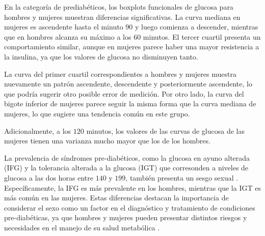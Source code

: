 En la categoría de prediabéticos, los boxplots funcionales de glucosa para hombres y mujeres muestran diferencias significativas. La curva mediana en mujeres es ascendente hasta el minuto $90$ y luego comienza a descender, mientras que en hombres alcanza su máximo a los $60$ minutos. El tercer cuartil presenta un comportamiento similar, aunque en mujeres parece haber una mayor resistencia a la insulina, ya que los valores de glucosa no disminuyen tanto.

La curva del primer cuartil correspondientes a hombres y mujeres muestra nuevamente un patrón ascendente, descendente y posteriormente ascendente, lo que podría sugerir otro posible error de medición. Por otro lado, la curva del bigote inferior de mujeres parece seguir la misma forma que la curva mediana de mujeres, lo que sugiere una tendencia común en este grupo.

Adicionalmente, a los $120$ minutos, los valores de las curvas de glucosa de las mujeres tienen una varianza mucho mayor que los de los hombres. 

La prevalencia de síndromes pre-diabéticos, como la glucosa en ayuno alterada (IFG) y la tolerancia alterada a la glucosa (IGT) que corresonden a niveles de glucosa a las dos horas entre $140$ y $199$, también presenta un sesgo sexual \cite{GenderDifferences2018}. Específicamente, la IFG es más prevalente en los hombres, mientras que la IGT es más común en las mujeres. Estas diferencias destacan la importancia de considerar el sexo como un factor en el diagnóstico y tratamiento de condiciones pre-diabéticas, ya que hombres y mujeres pueden presentar distintos riesgos y necesidades en el manejo de su salud metabólica \cite{GenderDifferences2018}.

